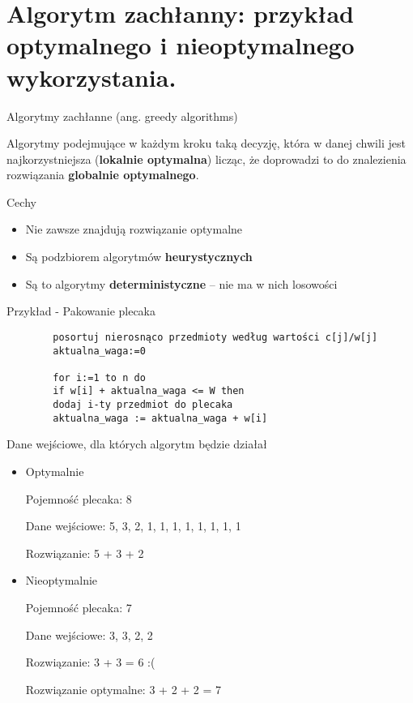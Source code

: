 \documentclass[main.tex]{subfiles}
\begin{document}
    \newpage

    \section{Algorytm zachłanny: przykład optymalnego i nieoptymalnego wykorzystania.}

    \begin{definition}
        Algorytmy zachłanne (ang. greedy algorithms)

        Algorytmy podejmujące w każdym kroku taką decyzję, która w danej chwili jest najkorzystniejsza (\textbf{lokalnie optymalna}) licząc, że doprowadzi to do znalezienia rozwiązania \textbf{globalnie optymalnego}.

        Cechy

        \begin{itemize}
            \item Nie zawsze znajdują rozwiązanie optymalne
            \item Są podzbiorem algorytmów \textbf{heurystycznych}
            \item Są to algorytmy \textbf{deterministyczne} – nie ma w nich losowości
        \end{itemize}

    \end{definition}


    Przykład - Pakowanie plecaka

    \begin{verbatim}
        posortuj nierosnąco przedmioty według wartości c[j]/w[j]
        aktualna_waga:=0

        for i:=1 to n do
        if w[i] + aktualna_waga <= W then
        dodaj i-ty przedmiot do plecaka
        aktualna_waga := aktualna_waga + w[i]
    \end{verbatim}

    Dane wejściowe, dla których algorytm będzie działał
    \begin{itemize}
        \item Optymalnie

        Pojemność plecaka: 8

        Dane wejściowe: 5, 3, 2, 1, 1, 1, 1, 1, 1, 1, 1

        Rozwiązanie: 5 + 3 + 2

        \item Nieoptymalnie

        Pojemność plecaka: 7

        Dane wejściowe: 3, 3, 2, 2

        Rozwiązanie: 3 + 3 = 6 :(

        Rozwiązanie optymalne: 3 + 2 + 2 = 7

    \end{itemize}
\end{document}
